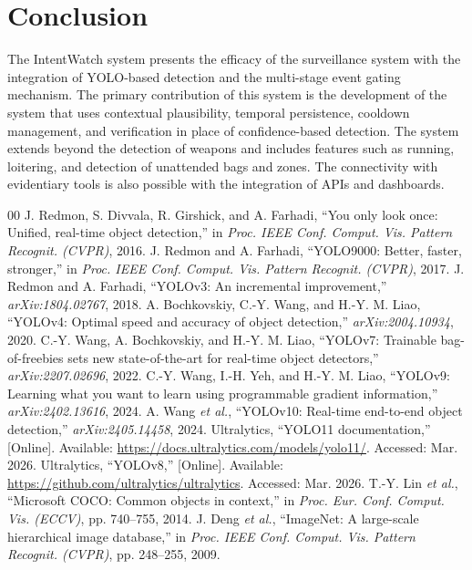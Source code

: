 \documentclass[conference]{IEEEtran}
\newcommand{\IntentWatch}{IntentWatch}
\begin{document}
\section{Conclusion}
The \IntentWatch{} system presents the efficacy of the surveillance system with the integration of YOLO-based detection and the multi-stage event gating mechanism. The primary contribution of this system is the development of the system that uses contextual plausibility, temporal persistence, cooldown management, and verification in place of confidence-based detection. The system extends beyond the detection of weapons and includes features such as running, loitering, and detection of unattended bags and zones. The connectivity with evidentiary tools is also possible with the integration of APIs and dashboards.

\begin{thebibliography}{00}
J. Redmon, S. Divvala, R. Girshick, and A. Farhadi, ``You only look once: Unified, real-time object detection,'' in \textit{Proc. IEEE Conf. Comput. Vis. Pattern Recognit. (CVPR)}, 2016.
J. Redmon and A. Farhadi, ``YOLO9000: Better, faster, stronger,'' in \textit{Proc. IEEE Conf. Comput. Vis. Pattern Recognit. (CVPR)}, 2017.
J. Redmon and A. Farhadi, ``YOLOv3: An incremental improvement,'' \textit{arXiv:1804.02767}, 2018.
A. Bochkovskiy, C.-Y. Wang, and H.-Y. M. Liao, ``YOLOv4: Optimal speed and accuracy of object detection,'' \textit{arXiv:2004.10934}, 2020.
C.-Y. Wang, A. Bochkovskiy, and H.-Y. M. Liao, ``YOLOv7: Trainable bag-of-freebies sets new state-of-the-art for real-time object detectors,'' \textit{arXiv:2207.02696}, 2022.
C.-Y. Wang, I.-H. Yeh, and H.-Y. M. Liao, ``YOLOv9: Learning what you want to learn using programmable gradient information,'' \textit{arXiv:2402.13616}, 2024.
A. Wang \textit{et al.}, ``YOLOv10: Real-time end-to-end object detection,'' \textit{arXiv:2405.14458}, 2024.
Ultralytics, ``YOLO11 documentation,'' [Online]. Available: \url{https://docs.ultralytics.com/models/yolo11/}. Accessed: Mar. 2026.
Ultralytics, ``YOLOv8,'' [Online]. Available: \url{https://github.com/ultralytics/ultralytics}. Accessed: Mar. 2026.
T.-Y. Lin \textit{et al.}, ``Microsoft COCO: Common objects in context,'' in \textit{Proc. Eur. Conf. Comput. Vis. (ECCV)}, pp. 740--755, 2014.
J. Deng \textit{et al.}, ``ImageNet: A large-scale hierarchical image database,'' in \textit{Proc. IEEE Conf. Comput. Vis. Pattern Recognit. (CVPR)}, pp. 248--255, 2009.

\end{thebibliography}
\end{document}
